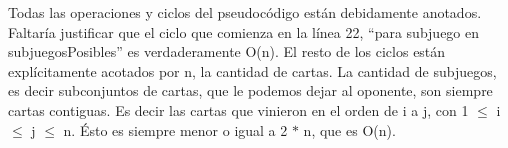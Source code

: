 \documentclass[11pt, a4paper, twoside]{article}
\begin{document}
{}

Todas las operaciones y ciclos del pseudocódigo están debidamente anotados. Faltaría justificar que el ciclo que comienza en la línea 22, ``para subjuego en subjuegosPosibles'' es verdaderamente O(n).
El resto de los ciclos están explícitamente acotados por n, la cantidad de cartas.
La cantidad de subjuegos, es decir subconjuntos de cartas, que le podemos dejar al oponente, son siempre cartas contiguas. Es decir las cartas que vinieron en el orden de i a j, con 1 $\leq$ i $\leq$ j $\leq$ n. Ésto es siempre menor o igual a 2 $*$ n, que es O(n).
\end{document}
